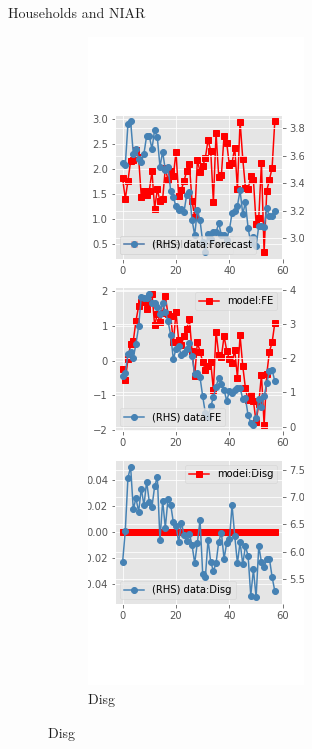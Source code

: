 \documentclass{beamer}
\begin{document}
\begin{frame}{Households and NIAR}
\begin{figure}[ht]
\begin{subfigure}[b]{0.2\textwidth}
		\end{subfigure}
		\hfill
		\begin{subfigure}[b]{0.2\textwidth}
			\caption{Disg}
			\includegraphics[width=\textwidth, height = 0.8\textheight]{figuresDraft/sce_ni_est_diag1.png}

\end{subfigure}
\end{figure}
\end{frame}
\end{document}
